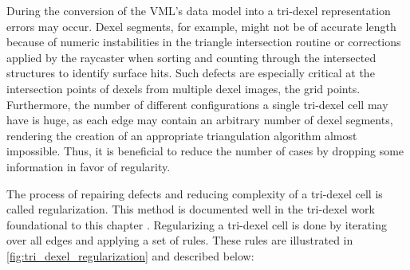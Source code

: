 During the conversion of the VML's data model into a tri-dexel representation errors may occur.
Dexel segments, for example, might not be of accurate length because of numeric instabilities in the triangle intersection routine or corrections applied by the raycaster when sorting and counting through the intersected structures to identify surface hits.
Such defects are especially critical at the intersection points of dexels from multiple dexel images, the grid points.
Furthermore, the number of different configurations a single tri-dexel cell may have is huge, as each edge may contain an arbitrary number of dexel segments, rendering the creation of an appropriate triangulation algorithm almost impossible.
Thus, it is beneficial to reduce the number of cases by dropping some information in favor of regularity.

The process of repairing defects and reducing complexity of a tri-dexel cell is called regularization.
This method is documented well in the tri-dexel work foundational to this chapter \cite{tridexel_reconstruction}.
Regularizing a tri-dexel cell is done by iterating over all edges and applying a set of rules.
These rules are illustrated in \cref{fig:tri_dexel_regularization} and described below:

